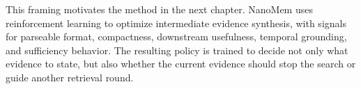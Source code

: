 This framing motivates the method in the next chapter. NanoMem uses
reinforcement learning to optimize intermediate evidence synthesis, with
signals for parseable format, compactness, downstream usefulness, temporal
grounding, and sufficiency behavior. The resulting policy is trained to decide
not only what evidence to state, but also whether the current evidence should
stop the search or guide another retrieval round.
